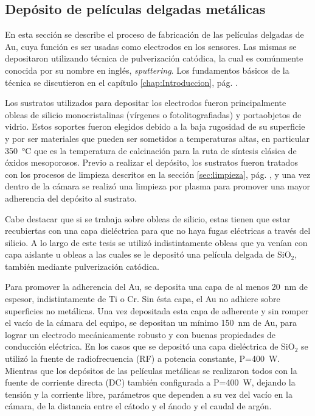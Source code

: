 	\subsection{Depósito de películas delgadas metálicas}\label{sec:sputt}

			En esta sección se describe el proceso de fabricación de las películas delgadas de Au, cuya función es ser usadas como electrodos en los sensores. Las mismas se depositaron utilizando técnica de pulverización catódica, la cual es comúnmente conocida por su nombre en inglés, \textit{sputtering}\cite{sigmund1968}. Los fundamentos básicos de la técnica se discutieron en el capítulo \ref{chap:Introduccion}, pág. \pageref{sec:microfabricacion}.
							
			Los sustratos utilizados para depositar los electrodos fueron principalmente obleas de silicio monocristalinas (vírgenes o fotolitografiadas) y portaobjetos de vidrio. Estos soportes fueron elegidos debido a la baja rugosidad de su superficie y por ser materiales que pueden ser sometidos a temperaturas altas, en particular \SI{350}{\celsius} que es la temperatura de calcinación para la ruta de síntesis clásica de óxidos mesoporosos. Previo a realizar el depósito, los sustratos fueron tratados con los procesos de limpieza descritos en la sección \ref{sec:limpieza}, pág. \pageref{sec:limpieza}, y una vez dentro de la cámara se realizó una limpieza por plasma para promover una mayor adherencia del depósito al sustrato.

			Cabe destacar que si se trabaja sobre obleas de silicio, estas tienen que estar recubiertas con una capa dieléctrica para que no haya fugas eléctricas a través del silicio. A lo largo de este tesis se utilizó indistintamente obleas que ya venían con capa aislante u obleas a las cuales se le depositó una película delgada de SiO$_2$, también mediante pulverización catódica.

			Para promover la adherencia del Au, se deposita una capa de al menos \SI{20}{\nm} de espesor, indistintamente de Ti o Cr. Sin ésta capa, el Au no adhiere sobre superficies no metálicas\cite{Hieber1976}. Una vez depositada esta capa de adherente y sin romper el vacío de la cámara del equipo, se depositan un mínimo \SI{150}{\nm} de Au, para lograr un electrodo mecánicamente robusto y con buenas propiedades de conducción eléctrica. En los casos que se depositó una capa dieléctrica de SiO$_2$ se utilizó la fuente de radiofrecuencia (RF) a potencia constante, P=\SI{400}{W}. Mientras que los depósitos de las películas metálicas se realizaron todos con la fuente de corriente directa (DC) también configurada a P=\SI{400}{W}, dejando la tensión y la corriente libre, parámetros que dependen a su vez del vacío en la cámara, de la distancia entre el cátodo y el ánodo y el caudal de argón. 


